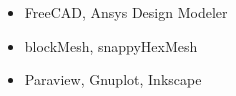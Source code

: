 
\vspace{5pt}
\begin{itemize}
  \item FreeCAD, Ansys Design Modeler
  \item blockMesh, snappyHexMesh
  \item Paraview, Gnuplot, Inkscape
\end{itemize}

